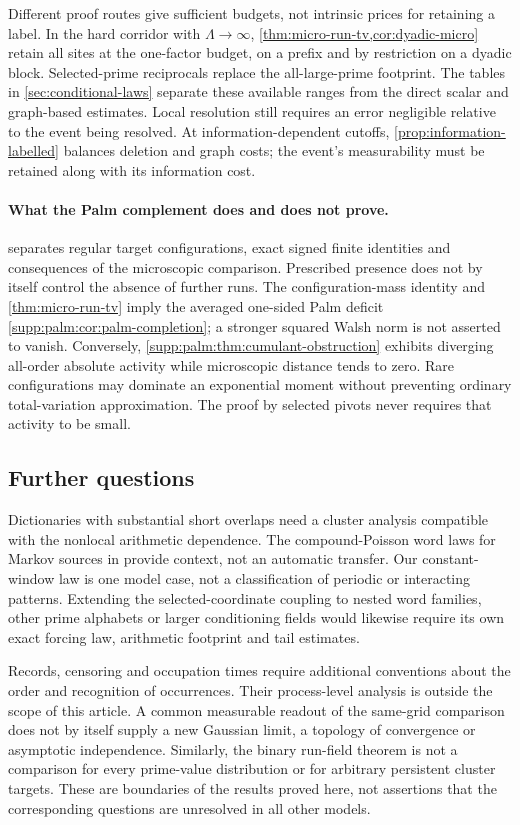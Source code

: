 Different proof routes give sufficient budgets, not intrinsic prices
for retaining a label. In the hard corridor with $\Lambda\to\infty$,
\cref{thm:micro-run-tv,cor:dyadic-micro} retain all sites at the
one-factor budget, on a prefix and by restriction on a dyadic block.
Selected-prime reciprocals replace the all-large-prime footprint. The
tables in \cref{sec:conditional-laws} separate these available ranges
from the direct scalar and graph-based estimates. Local resolution still
requires an error negligible relative to the event being resolved.
At information-dependent cutoffs, \cref{prop:information-labelled}
balances deletion and graph costs; the event's measurability must be
retained along with its information cost.

\paragraph{What the Palm complement does and does not prove.}
 separates regular target configurations,
exact signed finite identities and consequences of the microscopic
comparison. Prescribed presence does not by itself control the absence
of further runs. The configuration-mass identity and
\cref{thm:micro-run-tv} imply the averaged one-sided Palm deficit
\cref{supp:palm:cor:palm-completion}; a stronger squared Walsh norm is
not asserted to vanish. Conversely,
\cref{supp:palm:thm:cumulant-obstruction} exhibits diverging all-order
absolute activity while microscopic distance tends to zero. Rare
configurations may dominate an exponential moment without preventing
ordinary total-variation approximation. The proof by selected pivots
never requires that activity to be small.

\subsection{Further questions}
Dictionaries with substantial short overlaps need a cluster analysis
compatible with the nonlocal arithmetic dependence. The compound-Poisson
word laws for Markov sources in
\cite{ReinertSchbath1998,RoquainSchbath2007} provide context, not an
automatic transfer. Our constant-window law is one model case, not a
classification of periodic or interacting patterns. Extending the
selected-coordinate coupling to nested word families, other prime
alphabets or larger conditioning fields would likewise require its own
exact forcing law, arithmetic footprint and tail estimates.

Records, censoring and occupation times require additional conventions
about the order and recognition of occurrences. Their process-level
analysis is outside the scope of this article. A common measurable
readout of the same-grid comparison does not by itself supply a new
Gaussian limit, a topology of convergence or asymptotic independence.
Similarly, the binary run-field theorem is not a comparison for every
prime-value distribution or for arbitrary persistent cluster targets.
These are boundaries of the results proved here, not assertions that
the corresponding questions are unresolved in all other models.
